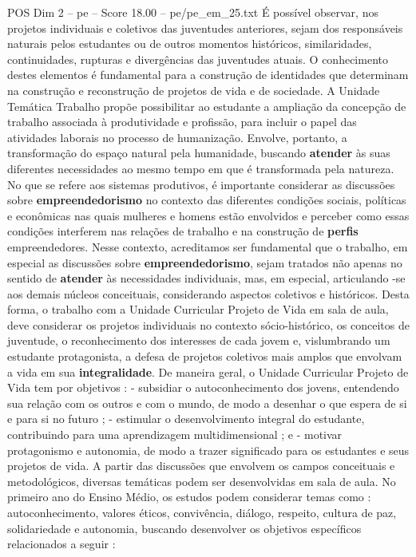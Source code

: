 \begin{textsample}{POS Dim 2 – pe – Score 18.00 – pe/pe\_em\_25.txt}
É possível observar, nos projetos individuais e coletivos das juventudes anteriores, sejam dos responsáveis naturais pelos estudantes ou de outros momentos históricos, similaridades, continuidades, rupturas e divergências das juventudes atuais.
O conhecimento destes elementos é fundamental para a construção de identidades que determinam na construção e reconstrução de projetos de vida e de sociedade.
A Unidade Temática Trabalho propõe possibilitar ao estudante a ampliação da concepção de trabalho associada à produtividade e profissão, para incluir o papel das atividades laborais no processo de humanização.
Envolve, portanto, a transformação do espaço natural pela humanidade, buscando \textbf{atender} às suas diferentes necessidades ao mesmo tempo em que é transformada pela natureza.
No que se refere aos sistemas produtivos, é importante considerar as discussões sobre \textbf{empreendedorismo} no contexto das diferentes condições sociais, políticas e econômicas nas quais mulheres e homens estão envolvidos e perceber como essas condições interferem nas relações de trabalho e na construção de \textbf{perfis} empreendedores.
Nesse contexto, acreditamos ser fundamental que o trabalho, em especial as discussões sobre \textbf{empreendedorismo}, sejam tratados não apenas no sentido de \textbf{atender} às necessidades individuais, mas, em especial, articulando -se aos demais núcleos conceituais, considerando aspectos coletivos e históricos.
Desta forma, o trabalho com a Unidade Curricular Projeto de Vida em sala de aula, deve considerar os projetos individuais no contexto sócio-histórico, os conceitos de juventude, o reconhecimento dos interesses de cada jovem e, vislumbrando um estudante protagonista, a defesa de projetos coletivos mais amplos que envolvam a vida em sua \textbf{integralidade}.
De maneira geral, o Unidade Curricular Projeto de Vida tem por objetivos : - subsidiar o autoconhecimento dos jovens, entendendo sua relação com os outros e com o mundo, de modo a desenhar o que espera de si e para si no futuro ; - estimular o desenvolvimento integral do estudante, contribuindo para uma aprendizagem multidimensional ; e - motivar protagonismo e autonomia, de modo a trazer significado para os estudantes e seus projetos de vida.
A partir das discussões que envolvem os campos conceituais e metodológicos, diversas temáticas podem ser desenvolvidas em sala de aula.
No primeiro ano do Ensino Médio, os estudos podem considerar temas como : autoconhecimento, valores éticos, convivência, diálogo, respeito, cultura de paz, solidariedade e autonomia, buscando desenvolver os objetivos específicos relacionados a seguir :

\end{textsample}
